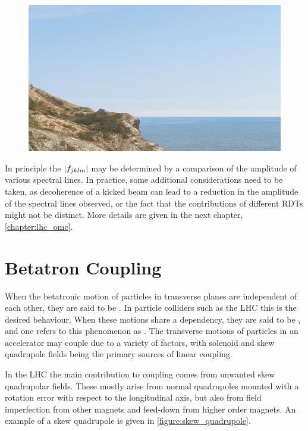\begin{figure}[!htb]
    \begin{center}
    \includegraphics[width = 0.3\linewidth]{Figures/placeholder.png}
    \caption{}
    \label{figure:example_spectrum}
    \end{center}
\end{figure}

In principle the \(\left\lvert f_{jklm} \right\rvert\) may be determined by a comparison of the amplitude of various spectral lines.
In practice, some additional considerations need to be taken, as decoherence of a kicked beam can lead to a reduction in the amplitude of the spectral lines observed, or the fact that the contributions of different RDTs might not be distinct.
More details are given in the next chapter, \cref{chapter:lhc_omc}.


\section{Betatron Coupling}
\label{section:betatron_coupling}

When the betatronic motion of particles in transverse planes are independent of each other, they are said to be .
In particle colliders such as the LHC this is the desired behaviour.
When these motions share a dependency, they are said to be , and one refers to this phenomenon as .
The transverse motions of particles in an accelerator may couple due to a variety of factors, with solenoid and skew quadrupole fields being the primary sources of linear coupling.

In the LHC the main contribution to coupling comes from unwanted skew quadrupolar fields.
These mostly arise from normal quadrupoles mounted with a rotation error with respect to the longitudinal axis, but also from field imperfection from other magnets and feed-down from higher order magnets.
An example of a skew quadrupole is given in \cref{figure:skew_quadrupole}.

